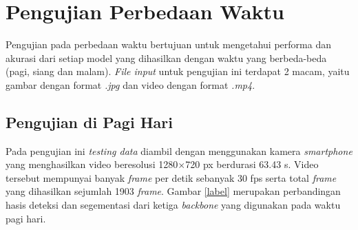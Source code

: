\section{Pengujian Perbedaan Waktu}
\label{sec:pengujian-waktu}

Pengujian pada perbedaan waktu bertujuan untuk mengetahui performa dan akurasi dari setiap model yang dihasilkan dengan waktu yang berbeda-beda (pagi, siang dan malam). \textit{File input} untuk pengujian ini terdapat 2 macam, yaitu gambar dengan format \textit{.jpg} dan video dengan format \textit{.mp4}.

\subsection{Pengujian di Pagi Hari}
\label{subsec:pagi}

Pada pengujian ini \textit{testing data} diambil dengan menggunakan kamera \textit{smartphone} yang menghasilkan video beresolusi 1280$\times$720 px berdurasi 63.43 s. Video tersebut mempunyai banyak \textit{frame} per detik sebanyak 30 fps serta total \textit{frame} yang dihasilkan sejumlah 1903 \textit{frame}. Gambar \ref{label} merupakan perbandingan hasis deteksi dan segementasi dari ketiga \textit{backbone} yang digunakan pada waktu pagi hari.
